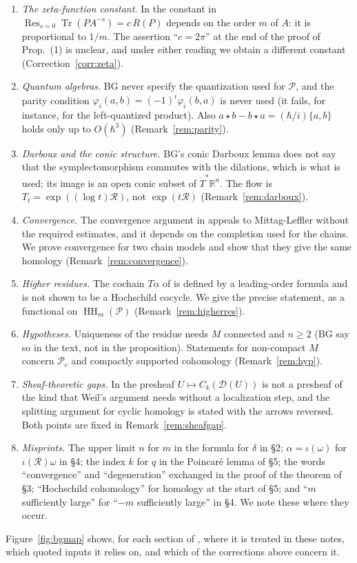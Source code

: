 \documentclass[11pt,oneside,reqno]{article}
\DeclareMathOperator{\HH}{HH}
\DeclareMathOperator{\Tr}{Tr}
\DeclareMathOperator{\Res}{Res}
\newcommand{\R}{\mathbb R}
\newcommand{\cD}{\mathcal D}
\newcommand{\cP}{\mathcal P}
\newcommand{\Tdot}{\dot T^*}
\newcommand{\hb}{\hbar}
\theoremstyle{plain}
\theoremstyle{definition}
\theoremstyle{remark}
\begin{document}
\begin{enumerate}
(Correction~\ref{corr:cyclicfilt}).
\item \emph{The zeta-function constant.} In \cite[\S4, Prop.~(2)]{BG}
the constant in \(\Res_{s=0}\Tr(PA^{-s})=c\,R(P)\) depends on the order
\(m\) of \(A\): it is proportional to \(1/m\). The assertion ``\(c=2\pi\)'' at the end of the
proof of Prop.~(1) is unclear, and under either reading we obtain a different
constant (Correction~\ref{corr:zeta}).
\item \emph{Quantum algebras.} BG never specify the quantization used for
\(\cP\), and the parity condition \(\varphi_i(a,b)=(-1)^i\varphi_i(b,a)\) is never used (it
fails, for instance, for the left-quantized product). Also
\(a\star b-b\star a=(\hb/i)\{a,b\}\) holds only up to \(O(\hb^3)\)
(Remark~\ref{rem:parity}).
\item \emph{Darboux and the conic structure.} BG's conic Darboux lemma does not
say that the symplectomorphism commutes with the dilations, which is what is
used; its image is an open conic subset of \(\Tdot\R^n\). The flow is \(T_t=\exp((\log t)\mathcal R)\), not \(\exp(t\mathcal R)\)
(Remark~\ref{rem:darboux}).
\item \emph{Convergence.} The convergence argument in \cite[\S\S2,4]{BG}
appeals to Mittag-Leffler without the required estimates, and it depends
on the completion used for the chains. We prove convergence for two chain
models and show that they give the same homology
(Remark~\ref{rem:convergence}).
\item \emph{Higher residues.} The cochain \(T\alpha\) of \cite[\S4]{BG} is
defined by a leading-order formula and is not shown to be a Hochschild
cocycle. We give the precise statement, as a functional on \(\HH_m(\cP)\)
(Remark~\ref{rem:higherres}).
\item \emph{Hypotheses.} Uniqueness of the residue needs \(M\) connected
and \(n\ge2\) (BG say so in the text, not in the proposition). Statements
for non-compact \(M\) concern \(\cP_c\) and compactly supported
cohomology (Remark~\ref{rem:hyp}).
\item \emph{Sheaf-theoretic gaps.} In \cite[\S5]{BG} the presheaf
\(U\mapsto C_k(\cD(U))\) is not a presheaf of the kind that Weil's
argument needs without a localization step, and the splitting argument
for cyclic homology is stated with the arrows reversed. Both points are
fixed in Remark~\ref{rem:sheafgap}.
\item \emph{Misprints.} The upper limit \(n\) for \(m\) in the formula for
\(\delta\) in \S2; \(\alpha=\iota(\omega)\) for \(\iota(\mathcal R)\omega\) in
\S4; the index \(k\) for \(q\) in the Poincaré lemma of \S5; the words
``convergence'' and ``degeneration'' exchanged in the proof of the theorem
of \S3; ``Hochschild cohomology'' for homology at the start of \S5; and
``\(m\) sufficiently large'' for ``\(-m\) sufficiently large'' in \S4. We
note these where they occur.
\end{enumerate}
Figure~\ref{fig:bgmap} shows, for each section of \cite{BG}, where it is treated
in these notes, which quoted inputs it relies on, and which of the corrections
above concern it.
\end{document}
